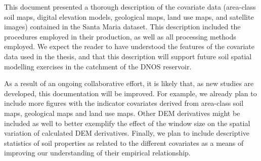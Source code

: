 This document presented a thorough description of the covariate data (area-class soil maps, digital elevation 
models, geological maps, land use maps, and satellite images) contained in the Santa Maria dataset. This 
description included the procedures employed in their production, as well as all processing methods employed. 
We expect the reader to have understood the features of the covariate data used in the thesis, and that this 
description will support future soil spatial modelling exercises in the catchment of the DNOS reservoir.

As a result of an ongoing collaborative effort, it is likely that, as new studies are developed, this 
documentation will be improved. For example, we already plan to include more figures with the indicator 
covariates derived from area-class soil maps, geological maps and land use maps. Other DEM derivatives might be 
included as well to better exemplify the effect of the window size on the spatial variation of calculated DEM 
derivatives. Finally, we plan to include descriptive statistics of soil properties as related to the different 
covariates as a means of improving our understanding of their empirical relationship.
